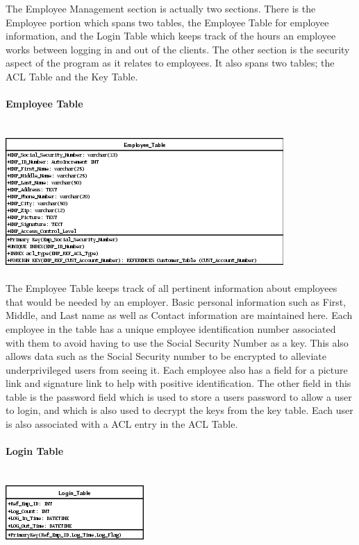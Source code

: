 \documentclass{report}
\begin{document}
        The Employee Management section is actually two sections. There is the Employee portion which
        spans two tables, the Employee Table for employee information, and the Login Table which
        keeps track of the hours an employee works between logging in and out of the clients. The
        other section is the security aspect of the program as it relates to employees. It also spans
        two tables; the ACL Table and the Key Table.\\
        \\
        {\bf Employee Table}\\
        \\
        \\
        \includegraphics{Tables/EmployeeTable.png}
        \\
        \\
        The Employee Table keeps track of all pertinent information about employees that would
        be needed by an employer. Basic personal information such as First, Middle, and Last name
        as well as Contact information are maintained here. Each employee in the table has a unique
        employee identification number associated with them to avoid having to use the Social
        Security Number as a key. This also allows data such as the Social Security number to be
        encrypted to alleviate underprivileged users from seeing it. Each employee also has a
        field for a picture link and signature link to help with positive identification. The other
        field in this table is the password field which is used to store a users password to allow
        a user to login, and which is also used to decrypt the keys from the key table. Each user
        is also associated with a ACL entry in the ACL Table.\\
        \\
        {\bf Login Table}\\
        \\
        \\
        \includegraphics{Tables/LoginTable.png}\\
\end{document}
